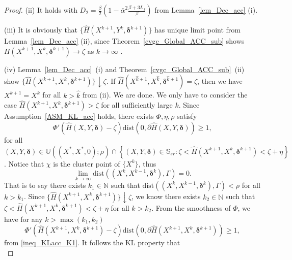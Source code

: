 \documentclass[twoside,11pt]{article}
\numberwithin{equation}{section}
\begin{document}
\begin{proof}
 
(ii)  
    It holds with $D_{2}=\frac{\beta}{2} \left(1-\bar{\alpha}^{2}\frac{\beta+3L_{f}}{\beta}\right) $ from  Lemma~\ref{lem_Dec_acc} (i). 
  
(iii)  
    It is obviously that $\{\hat{H} (X^{k+1},Y^{k},\bm{\delta}^{k+1} )\} $ has unique limit point from Lemma~\ref{lem_Dec_acc} (ii), since Theorem~\ref{cvgc_Global_ACC_sub} shows $H(X^{k+1},X^{k},\bm{\delta}^{k+1} )\to\zeta$ as $k\to\infty$ . 
     
(iv)  
    Lemma~\ref{lem_Dec_acc}~(i) and Theorem~\ref{cvgc_Global_ACC_sub}~(ii) show $\{\hat{H} (X^{k+1},X^{k},\bm{\delta}^{k+1} ) \}\downarrow  \zeta $. If   $\hat{H} (X^{\hat{k}+1},X^{\hat{k}},\bm{\delta}^{\hat{k}+1})=\zeta $,  then we have $X^{k+1} = X^{k} $ for all $k>\hat{k} $ from  (ii). We are done.   
    We only have to consider the case  $\hat{H} (X^{k+1},X^{k},\bm{\delta}^{k+1})>\zeta $ for all sufficiently large $k $.
    Since Assumption~\ref{ASM_KL_acc} holds, there exists $\Phi,\eta,\rho $ satisfy 
    \begin{equation}\label{ineq_KLacc_K1}
      \Phi{'} \left(\hat{H} (X,Y,\bm{\delta})-\zeta\right) \mathrm{dist} \left(0,\partial \hat{H} (X,Y,\bm{\delta})\right)\ge 1,
    \end{equation}
    for all $ (X,Y,\bm{\delta})\in\mathbb{U} ( (X^{*},X^{*},0);\rho)\cap\left\{ (X,Y,\bm{\delta})\in\mathbb{S}_{sr}:\zeta<\hat{H} (X^{k+1},X^{k},\bm{\delta}^{k+1})<\zeta+\eta\right\} $.  Notice that $\chi $ is the cluster point of $\{X^{k}\} $, thus
    \begin{equation*}
      \lim\limits_{k\to\infty} \mathrm{dist} ( (X^{k},X^{k-1},\bm{\delta}^{k}),\Gamma) = 0 .
    \end{equation*}
    That is to say there exists $k_{1}\in\mathbb{N} $ such that  $\mathrm{dist} ( (X^{k},X^{k-1},\bm{\delta}^{k}),\Gamma) < \rho $ for all $k>k_{1} $.   
    Since $\{ \hat{H} (X^{k+1},X^{k},\bm{\delta}^{k+1})\} \downarrow \zeta$, we know there exists $k_{2}\in\mathbb{N} $ such that $\zeta<\hat{H} (X^{k+1},X^{k},\bm{\delta}^{k+1})<\zeta+\eta $ for all $k>k_{2} $. From the smoothness of $\Phi $, we have 
    for any  $k>\max \left(k_{1},k_{2}\right) $  
    \begin{equation}
      \Phi{'} \left(\hat{H} (X^{k+1},X^{k},\bm{\delta}^{k+1})-\zeta\right) \mathrm{dist} \left(0,\partial \hat{H} (X^{k+1},X^{k},\bm{\delta}^{k+1})\right)\ge 1,
    \end{equation} from \eqref{ineq_KLacc_K1}.  It follows the KL property that  
    \begin{equation}

\end{equation}
\end{proof}
\end{document}
